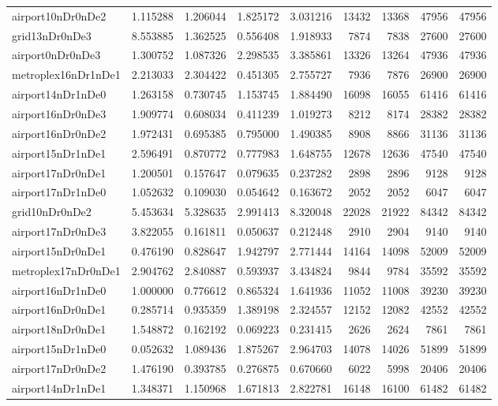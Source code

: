 \begin{longtable}{|l|r|r|r|r|r|r|r|r|}
airport10nDr0nDe2 & 1.115288 & 1.206044 & 1.825172 & 3.031216 & 13432 & 13368 & 47956 & 47956 \\
grid13nDr0nDe3 & 8.553885 & 1.362525 & 0.556408 & 1.918933 & 7874 & 7838 & 27600 & 27600 \\
airport0nDr0nDe3 & 1.300752 & 1.087326 & 2.298535 & 3.385861 & 13326 & 13264 & 47936 & 47936 \\
metroplex16nDr1nDe1 & 2.213033 & 2.304422 & 0.451305 & 2.755727 & 7936 & 7876 & 26900 & 26900 \\
airport14nDr1nDe0 & 1.263158 & 0.730745 & 1.153745 & 1.884490 & 16098 & 16055 & 61416 & 61416 \\
airport16nDr0nDe3 & 1.909774 & 0.608034 & 0.411239 & 1.019273 & 8212 & 8174 & 28382 & 28382 \\
airport16nDr0nDe2 & 1.972431 & 0.695385 & 0.795000 & 1.490385 & 8908 & 8866 & 31136 & 31136 \\
airport15nDr1nDe1 & 2.596491 & 0.870772 & 0.777983 & 1.648755 & 12678 & 12636 & 47540 & 47540 \\
airport17nDr0nDe1 & 1.200501 & 0.157647 & 0.079635 & 0.237282 & 2898 & 2896 & 9128 & 9128 \\
airport17nDr1nDe0 & 1.052632 & 0.109030 & 0.054642 & 0.163672 & 2052 & 2052 & 6047 & 6047 \\
grid10nDr0nDe2 & 5.453634 & 5.328635 & 2.991413 & 8.320048 & 22028 & 21922 & 84342 & 84342 \\
airport17nDr0nDe3 & 3.822055 & 0.161811 & 0.050637 & 0.212448 & 2910 & 2904 & 9140 & 9140 \\
airport15nDr0nDe1 & 0.476190 & 0.828647 & 1.942797 & 2.771444 & 14164 & 14098 & 52009 & 52009 \\
metroplex17nDr0nDe1 & 2.904762 & 2.840887 & 0.593937 & 3.434824 & 9844 & 9784 & 35592 & 35592 \\
airport16nDr1nDe0 & 1.000000 & 0.776612 & 0.865324 & 1.641936 & 11052 & 11008 & 39230 & 39230 \\
airport16nDr0nDe1 & 0.285714 & 0.935359 & 1.389198 & 2.324557 & 12152 & 12082 & 42552 & 42552 \\
airport18nDr0nDe1 & 1.548872 & 0.162192 & 0.069223 & 0.231415 & 2626 & 2624 & 7861 & 7861 \\
airport15nDr1nDe0 & 0.052632 & 1.089436 & 1.875267 & 2.964703 & 14078 & 14026 & 51899 & 51899 \\
airport17nDr0nDe2 & 1.476190 & 0.393785 & 0.276875 & 0.670660 & 6022 & 5998 & 20406 & 20406 \\
airport14nDr1nDe1 & 1.348371 & 1.150968 & 1.671813 & 2.822781 & 16148 & 16100 & 61482 & 61482 \\

\end{longtable}
